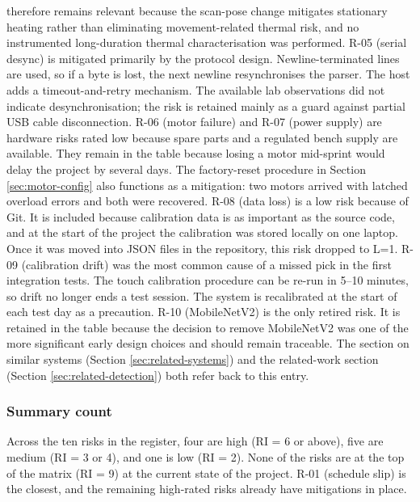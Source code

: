 therefore remains relevant because the scan-pose change mitigates
stationary heating rather than eliminating movement-related thermal risk,
and no instrumented long-duration thermal characterisation was performed.
R-05 (serial desync) is mitigated primarily by the protocol design.
Newline-terminated lines are used, so if a byte is lost, the next
newline resynchronises the parser. The host adds a timeout-and-retry
mechanism. The available lab observations did not indicate
desynchronisation; the risk is retained mainly as a guard against partial
USB cable disconnection.
R-06 (motor failure) and R-07 (power supply) are hardware risks rated
low because spare parts and a regulated bench supply are available. They
remain in the table because losing a motor mid-sprint would delay the
project by several days. The factory-reset procedure in
Section \ref{sec:motor-config} also functions as a mitigation: two
motors arrived with latched overload errors and both were recovered.
R-08 (data loss) is a low risk because of Git. It is included because
calibration data is as important as the source code, and at the start of
the project the calibration was stored locally on one laptop. Once it
was moved into JSON files in the repository, this risk dropped to L=1.
R-09 (calibration drift) was the most common cause of a missed pick
in the first integration tests. The touch calibration procedure can
be re-run in 5--10 minutes, so drift no longer ends a test session. The
system is recalibrated at the start of each test day as a precaution.
R-10 (MobileNetV2) is the only retired risk. It is retained in the table
because the decision to remove MobileNetV2 was one of the more
significant early design choices and should remain traceable. The
section on similar systems (Section \ref{sec:related-systems}) and the
related-work section (Section \ref{sec:related-detection}) both refer
back to this entry.
\subsubsection*{Summary count}
Across the ten risks in the register, four are high (RI = 6 or above),
five are medium (RI = 3 or 4), and one is low (RI = 2). None of the
risks are at the top of the matrix (RI = 9) at the current state of
the project. R-01 (schedule slip) is the closest, and the remaining
high-rated risks already have mitigations in place.
